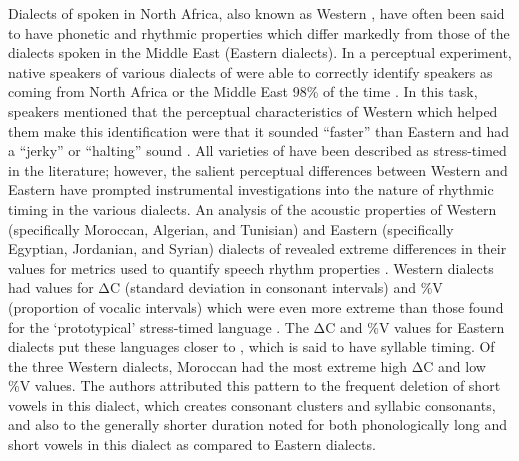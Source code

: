   Dialects of  spoken in North Africa, also known as Western , have often been said to have phonetic and rhythmic properties which differ markedly from those of the dialects spoken in the Middle East (Eastern  dialects). In a perceptual experiment, native speakers of various dialects of  were able to correctly identify  speakers as coming from North Africa or the Middle East 98\% of the time \citep{BarkatEtAl1999}. In this task, speakers mentioned that the perceptual characteristics of Western  which helped them make this identification were that it sounded “faster” than Eastern  and had a “jerky” or “halting” sound \citep{GhazaliEtAl2002}. All varieties of  have been described as stress-timed in the literature; however, the salient perceptual differences between Western and Eastern  have prompted instrumental investigations into the nature of rhythmic timing in the various dialects. An analysis of the acoustic properties of Western (specifically Moroccan, Algerian, and Tunisian) and Eastern (specifically Egyptian, Jordanian, and Syrian) dialects of  revealed extreme differences in their values for metrics used to quantify speech rhythm properties \citep{HamdiEtAl2004}. Western  dialects had values for ΔC (standard deviation in consonant intervals) and \%V (proportion of vocalic intervals) which were even more extreme than those found for the ‘prototypical’ stress-timed language . The ΔC and \%V values for Eastern  dialects put these languages closer to , which is said to have syllable timing. Of the three Western  dialects, Moroccan  had the most extreme high ΔC and low \%V values. The authors attributed this pattern to the frequent deletion of short vowels in this dialect, which creates consonant clusters and syllabic consonants, and also to the generally shorter duration noted for both phonologically long and short vowels in this dialect as compared to Eastern  dialects.


